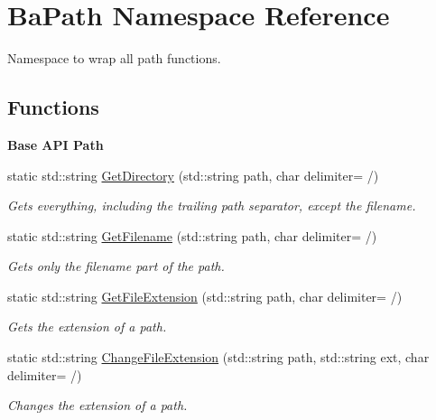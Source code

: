 \hypertarget{namespaceBaPath}{}\section{Ba\+Path Namespace Reference}
\label{namespaceBaPath}


Namespace to wrap all path functions.  


\subsection*{Functions}
\begin{Indent}{\bf Base A\+P\+I Path}\par
\begin{DoxyCompactItemize}
\item 
static std\+::string \hyperlink{namespaceBaPath_aee6b101395e5f32a76b304aa765de13c}{Get\+Directory} (std\+::string path, char delimiter= \textquotesingle{}/\textquotesingle{})
\begin{DoxyCompactList}\small\item\em Gets everything, including the trailing path separator, except the filename. \end{DoxyCompactList}\item 
static std\+::string \hyperlink{namespaceBaPath_a41d87786f4a43d64094624187ac90dca}{Get\+Filename} (std\+::string path, char delimiter= \textquotesingle{}/\textquotesingle{})
\begin{DoxyCompactList}\small\item\em Gets only the filename part of the path. \end{DoxyCompactList}\item 
static std\+::string \hyperlink{namespaceBaPath_a42b3acac9c048e45a531c9dc4be319f1}{Get\+File\+Extension} (std\+::string path, char delimiter= \textquotesingle{}/\textquotesingle{})
\begin{DoxyCompactList}\small\item\em Gets the extension of a path. \end{DoxyCompactList}\item 
static std\+::string \hyperlink{namespaceBaPath_a70f965f0c97d211e1f91dc2f16e05195}{Change\+File\+Extension} (std\+::string path, std\+::string ext, char delimiter= \textquotesingle{}/\textquotesingle{})
\begin{DoxyCompactList}\small\item\em Changes the extension of a path. \end{DoxyCompactList}\end{DoxyCompactItemize}
\end{Indent}


